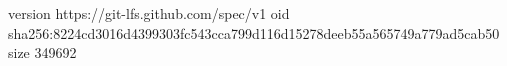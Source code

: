 version https://git-lfs.github.com/spec/v1
oid sha256:8224cd3016d4399303fc543cca799d116d15278deeb55a565749a779ad5cab50
size 349692
